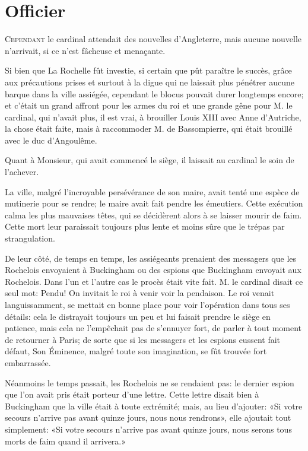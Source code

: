 
\chapter{Officier}

\lettrine{C}{ependant} le cardinal attendait des nouvelles d'Angleterre, mais aucune nouvelle n'arrivait, si ce n'est fâcheuse et menaçante. 

\zz
Si bien que La Rochelle fût investie, si certain que pût paraître le succès, grâce aux précautions prises et surtout à la digue qui ne laissait plus pénétrer aucune barque dans la ville assiégée, cependant le blocus pouvait durer longtemps encore; et c'était un grand affront pour les armes du roi et une grande gêne pour M. le cardinal, qui n'avait plus, il est vrai, à brouiller Louis XIII avec Anne d'Autriche, la chose était faite, mais à raccommoder M. de Bassompierre, qui était brouillé avec le duc d'Angoulême. 

Quant à Monsieur, qui avait commencé le siège, il laissait au cardinal le soin de l'achever. 

La ville, malgré l'incroyable persévérance de son maire, avait tenté une espèce de mutinerie pour se rendre; le maire avait fait pendre les émeutiers. Cette exécution calma les plus mauvaises têtes, qui se décidèrent alors à se laisser mourir de faim. Cette mort leur paraissait toujours plus lente et moins sûre que le trépas par strangulation. 

De leur côté, de temps en temps, les assiégeants prenaient des messagers que les Rochelois envoyaient à Buckingham ou des espions que Buckingham envoyait aux Rochelois. Dans l'un et l'autre cas le procès était vite fait. M. le cardinal disait ce seul mot: Pendu! On invitait le roi à venir voir la pendaison. Le roi venait languissamment, se mettait en bonne place pour voir l'opération dans tous ses détails: cela le distrayait toujours un peu et lui faisait prendre le siège en patience, mais cela ne l'empêchait pas de s'ennuyer fort, de parler à tout moment de retourner à Paris; de sorte que si les messagers et les espions eussent fait défaut, Son Éminence, malgré toute son imagination, se fût trouvée fort embarrassée. 

Néanmoins le temps passait, les Rochelois ne se rendaient pas: le dernier espion que l'on avait pris était porteur d'une lettre. Cette lettre disait bien à Buckingham que la ville était à toute extrémité; mais, au lieu d'ajouter: «Si votre secours n'arrive pas avant quinze jours, nous nous rendrons», elle ajoutait tout simplement: «Si votre secours n'arrive pas avant quinze jours, nous serons tous morts de faim quand il arrivera.» 

